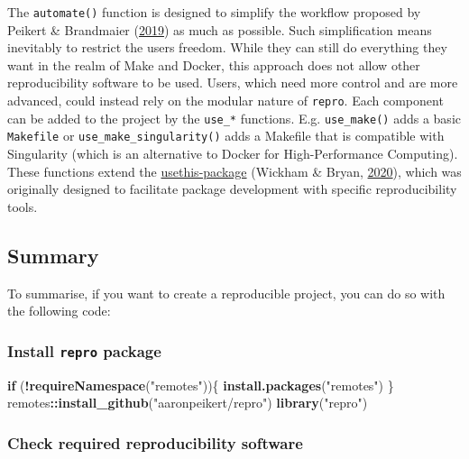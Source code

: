 \documentclass[12pt,a4paper,]{article}
\newenvironment{Shaded}{\begin{snugshade}}{\end{snugshade}}
\newcommand{\ControlFlowTok}[1]{\textcolor[rgb]{0.13,0.29,0.53}{\textbf{#1}}}
\newcommand{\KeywordTok}[1]{\textcolor[rgb]{0.13,0.29,0.53}{\textbf{#1}}}
\newcommand{\NormalTok}[1]{#1}
\newcommand{\OperatorTok}[1]{\textcolor[rgb]{0.81,0.36,0.00}{\textbf{#1}}}
\newcommand{\StringTok}[1]{\textcolor[rgb]{0.31,0.60,0.02}{#1}}
\begin{document}
The \texttt{automate()} function is designed to simplify the workflow proposed by Peikert \& Brandmaier (\protect\hyperlink{ref-peikertReproducibleDataAnalysis2019}{2019}) as much as possible.
Such simplification means inevitably to restrict the users freedom.
While they can still do everything they want in the realm of Make and Docker, this approach does not allow other reproducibility software to be used.
Users, which need more control and are more advanced, could instead rely on the modular nature of \texttt{repro}.
Each component can be added to the project by the \texttt{use\_*} functions.
E.g. \texttt{use\_make()} adds a basic \texttt{Makefile} or \texttt{use\_make\_singularity()} adds a Makefile that is compatible with Singularity (which is an alternative to Docker for High-Performance Computing).
These functions extend the \href{https://usethis.r-lib.org}{usethis-package} (Wickham \& Bryan, \protect\hyperlink{ref-R-usethis}{2020}), which was originally designed to facilitate package development with specific reproducibility tools.

\hypertarget{summary}{%
\subsection{Summary}\label{summary}}

To summarise, if you want to create a reproducible project, you can do so with the following code:

\hypertarget{install-repro-package}{%
\subsubsection{\texorpdfstring{Install \texttt{repro} package}{Install repro package}}\label{install-repro-package}}

\begin{Shaded}
\begin{Highlighting}[]
\ControlFlowTok{if}\NormalTok{ (}\OperatorTok{!}\KeywordTok{requireNamespace}\NormalTok{(}\StringTok{"remotes"}\NormalTok{))\{}
  \KeywordTok{install.packages}\NormalTok{(}\StringTok{"remotes"}\NormalTok{)}
\NormalTok{\}}
\NormalTok{remotes}\OperatorTok{::}\KeywordTok{install_github}\NormalTok{(}\StringTok{"aaronpeikert/repro"}\NormalTok{)}
\KeywordTok{library}\NormalTok{(}\StringTok{"repro"}\NormalTok{)}
\end{Highlighting}
\end{Shaded}

\hypertarget{check-required-reproducibility-software}{%
\subsubsection{Check required reproducibility software}\label{check-required-reproducibility-software}}
\end{document}
